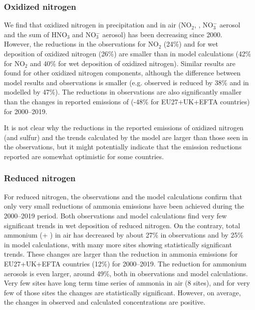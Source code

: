 \subsubsection*{Oxidized nitrogen}
We find that oxidized nitrogen in precipitation and in air (NO$_2$, , NO$_3^{-}$ aerosol and the sum of HNO$_3$ and NO$_3^{-}$ aerosol) has been decreasing since 2000. However, the reductions in the observations 
for NO$_2$ (24\%) and for wet deposition of oxidized nitrogen (26\%) %
are smaller than in model calculations (42\%
for NO$_2$ and 40\% 
for wet deposition of oxidized nitrogen). Similar results are found for other oxidized nitrogen components, although the difference between model results and observations is smaller (e.g. observed \noiii is reduced by 38\% and in modelled by 47\%). The reductions in observations
are also significantly smaller than the changes in reported emissions of \noii (-48\% for EU27+UK+EFTA countries) for 2000--2019.

It is not clear why the reductions in the reported emissions of oxidized nitrogen (and sulfur) and the trends calculated by the model are larger than those seen in the observations, but it might potentially indicate that the emission reductions reported are somewhat optimistic for some countries.

\subsubsection*{Reduced nitrogen}
For reduced nitrogen, the observations and the model calculations confirm that only very small reductions of ammonia emissions have been achieved during the 2000--2019 period. 
Both observations and model calculations find very few significant trends in wet deposition of reduced nitrogen.
On the contrary, total ammonium (\nhiii + \nhiv) in air has decreased by about 27\% in observations and by 25\% in model calculations, with many more sites showing statistically significant trends.
These changes are larger than the reduction in ammonia emissions for EU27+UK+EFTA countries (12\%)
for 2000--2019. The reduction for ammonium aerosols is even larger, around 49\%, 
both in observations and model calculations. Very few sites have long term time series of ammonia in air (8 sites), and for very few of those sites the changes are statistically significant. However, on average, the changes in observed and calculated concentrations are positive. 

